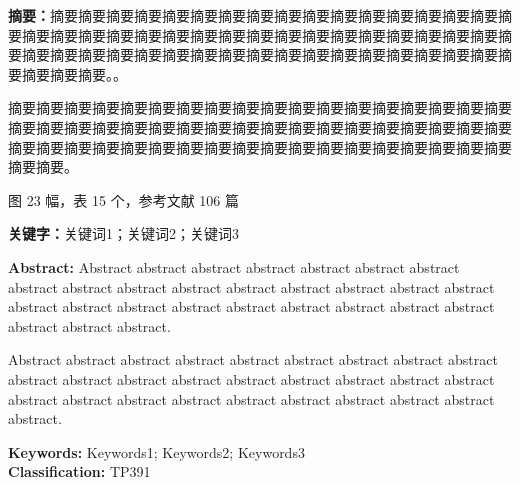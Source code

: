\begin{abstractcn}
    \noindent
    {\heiti \textbf{摘要：}}摘要摘要摘要摘要摘要摘要摘要摘要摘要摘要摘要摘要摘要摘要摘要摘要摘要摘要摘要摘要摘要摘要摘要摘要摘要摘要摘要摘要摘要摘要摘要摘要摘要摘要摘要摘要摘要摘要摘要摘要摘要摘要摘要摘要摘要摘要摘要摘要摘要摘要摘要摘要摘要摘要摘要摘要。。
    
    摘要摘要摘要摘要摘要摘要摘要摘要摘要摘要摘要摘要摘要摘要摘要摘要摘要摘要摘要摘要摘要摘要摘要摘要摘要摘要摘要摘要摘要摘要摘要摘要摘要摘要摘要摘要摘要摘要摘要摘要摘要摘要摘要摘要摘要摘要摘要摘要摘要摘要摘要摘要摘要摘要摘要摘要。
    
    \vspace*{\baselineskip}
    \noindent
    图 23 幅，表 15 个，参考文献 106 篇
    
    \vspace*{\baselineskip}
    \noindent
    {\heiti\textbf{关键字：}}关键词1；关键词2；关键词3\\

\end{abstractcn}

\begin{abstracten}
    \noindent
    \textbf{Abstract:} Abstract abstract abstract abstract abstract abstract abstract abstract abstract abstract abstract abstract abstract abstract abstract abstract abstract abstract abstract abstract abstract abstract abstract abstract abstract abstract abstract abstract. 
    
    Abstract abstract abstract abstract abstract abstract abstract abstract abstract abstract abstract abstract abstract abstract abstract abstract abstract abstract abstract abstract abstract abstract abstract abstract abstract abstract abstract abstract.
    
    \vspace*{2\baselineskip}
    \noindent
    {\textbf{Keywords:}} Keywords1; Keywords2; Keywords3\\
    {\textbf{Classification:}} TP391
\end{abstracten}